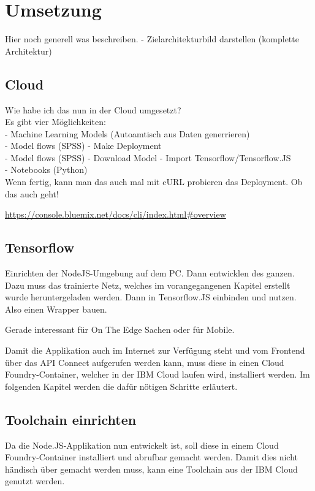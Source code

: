 \section{Umsetzung}
Hier noch generell was beschreiben. - Zielarchitekturbild darstellen (komplette Architektur)

\subsection{Cloud}
Wie habe ich das nun in der Cloud umgesetzt?\\
Es gibt vier Möglichkeiten:\\
- Machine Learning Models (Autoamtisch aus Daten generrieren)\\
- Model flows (SPSS) - Make Deployment\\
- Model flows (SPSS) - Download Model - Import Tensorflow/Tensorflow.JS\\
- Notebooks (Python)\\

Wenn fertig, kann man das auch mal mit cURL probieren das Deployment. Ob das auch geht!

\url{https://console.bluemix.net/docs/cli/index.html#overview}

\subsection{Tensorflow}
Einrichten der NodeJS-Umgebung auf dem PC. Dann entwicklen des ganzen. Dazu muss das trainierte Netz, welches im vorangegangenen
Kapitel erstellt wurde heruntergeladen werden. Dann in Tensorflow.JS einbinden und nutzen. Also einen Wrapper bauen.

Gerade interessant für On The Edge Sachen oder für Mobile.

Damit die Applikation auch im Internet zur Verfügung steht und vom Frontend über das API Connect aufgerufen werden kann,
muss diese in einen Cloud Foundry-Container, welcher in der IBM Cloud laufen wird, installiert werden. Im folgenden
Kapitel werden die dafür nötigen Schritte erläutert.

\subsection{Toolchain einrichten}
Da die Node.JS-Applikation nun entwickelt ist, soll diese in einem Cloud Foundry-Container installiert und abrufbar
gemacht werden. Damit dies nicht händisch über  gemacht werden muss, kann eine Toolchain aus der IBM Cloud
genutzt werden.

